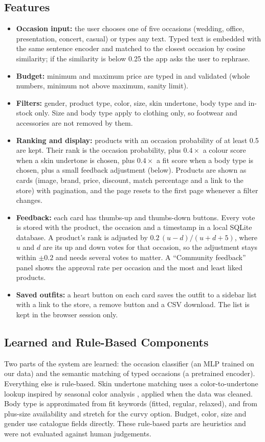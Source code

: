 \subsection{Features}
\begin{itemize}
  \item \textbf{Occasion input:} the user chooses one of five occasions (wedding, office, presentation, concert, casual) or types any text. Typed text is embedded with the same sentence encoder and matched to the closest occasion by cosine similarity; if the similarity is below 0.25 the app asks the user to rephrase.
  \item \textbf{Budget:} minimum and maximum price are typed in and validated (whole numbers, minimum not above maximum, sanity limit).
  \item \textbf{Filters:} gender, product type, color, size, skin undertone, body type and in-stock only. Size and body type apply to clothing only, so footwear and accessories are not removed by them.
  \item \textbf{Ranking and display:} products with an occasion probability of at least 0.5 are kept. Their rank is the occasion probability, plus $0.4\times$ a colour score when a skin undertone is chosen, plus $0.4\times$ a fit score when a body type is chosen, plus a small feedback adjustment (below). Products are shown as cards (image, brand, price, discount, match percentage and a link to the store) with pagination, and the page resets to the first page whenever a filter changes.
  \item \textbf{Feedback:} each card has thumbs-up and thumbs-down buttons. Every vote is stored with the product, the occasion and a timestamp in a local SQLite database. A product's rank is adjusted by $0.2\,(u-d)/(u+d+5)$, where $u$ and $d$ are its up and down votes for that occasion, so the adjustment stays within $\pm0.2$ and needs several votes to matter. A ``Community feedback'' panel shows the approval rate per occasion and the most and least liked products.
  \item \textbf{Saved outfits:} a heart button on each card saves the outfit to a sidebar list with a link to the store, a remove button and a CSV download. The list is kept in the browser session only.
\end{itemize}

\subsection{Learned and Rule-Based Components}
Two parts of the system are learned: the occasion classifier (an MLP trained on our data) and the semantic matching of typed occasions (a pretrained encoder).
Everything else is rule-based. Skin undertone matching uses a color-to-undertone lookup inspired by seasonal color analysis \cite{jackson1980color}, applied when the data was cleaned.
Body type is approximated from fit keywords (fitted, regular, relaxed), and from plus-size availability and stretch for the curvy option.
Budget, color, size and gender use catalogue fields directly. These rule-based parts are heuristics and were not evaluated against human judgements.

